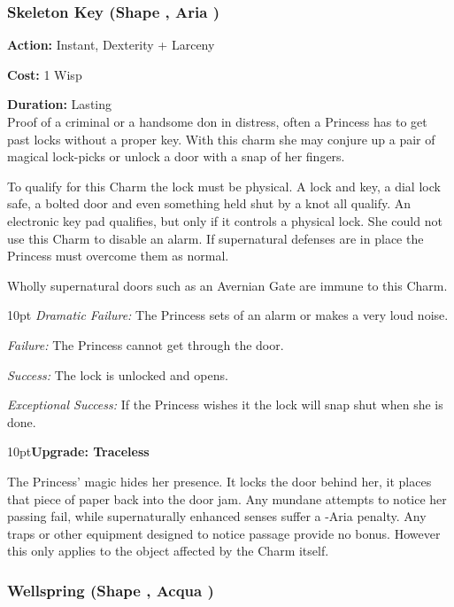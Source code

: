 \subsubsection*{Skeleton Key (Shape \textbullet, Aria \textbullet)}

\noindent \textbf{Action:} Instant, Dexterity + Larceny

\noindent \textbf{Cost:} 1 Wisp

\noindent \textbf{Duration:} Lasting \\

\noindent Proof of a criminal or a handsome don in distress, often a Princess has to get past locks without a proper key. With this charm she may conjure up a pair of magical lock-picks or unlock a door with a snap of her fingers. 

To qualify for this Charm the lock must be physical. A lock and key, a dial lock safe, a bolted door and even something held shut by a knot all qualify. An electronic key pad qualifies, but only if it controls a physical lock. She could not use this Charm to disable an alarm. If supernatural defenses are in place the Princess must overcome them as normal. 

Wholly supernatural doors such as an Avernian Gate are immune to this Charm.  

\begin{myindentpar}{10pt}    \emph{Dramatic Failure:} The Princess sets of an alarm or makes a very loud noise. 

\emph{Failure:} The Princess cannot get through the door. 

\emph{Success:} The lock is unlocked and opens.

\emph{Exceptional Success:} If the Princess wishes it the lock will snap shut when she is done.\end{myindentpar}

\begin{myindentpar}{10pt}\textbf{Upgrade: Traceless}

The Princess’ magic hides her presence. It locks the door behind her, it places that piece of paper back into the door jam. Any mundane attempts to notice her passing fail, while supernaturally enhanced senses suffer a -Aria penalty. Any traps or other equipment designed to notice passage provide no bonus. However this only applies to the object affected by the Charm itself. 

\end{myindentpar}

\subsubsection*{Wellspring (Shape \textbullet, Acqua \textbullet)}

